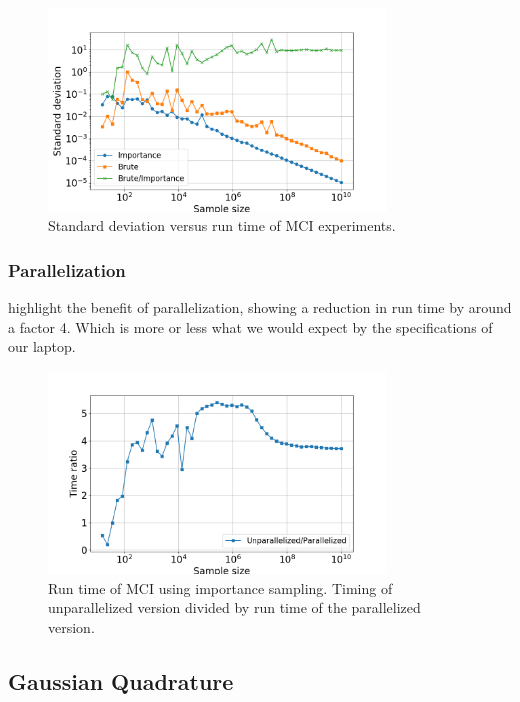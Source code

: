 \begin{figure}[H]
  \centering
  \includegraphics[width=0.8\textwidth]{../figures/mc_std_time.png}
  \caption{Standard deviation versus run time of MCI experiments.}

  \label{fig:mc_std_time}
\end{figure}

\subsubsection{Parallelization}

 highlight the benefit of parallelization, showing a
reduction in run time by around a factor 4. 
Which is more or less what we would expect
by the specifications of our laptop.     

\begin{figure}[H]
  \centering
  \includegraphics[width=0.8\textwidth]{../figures/mc_time_ratio.png}
  \caption{Run time of MCI using importance sampling. Timing of unparallelized
  version divided by run time of the parallelized version.}

  \label{fig:mc_time_ratio}
\end{figure}


\subsection{Gaussian Quadrature}

